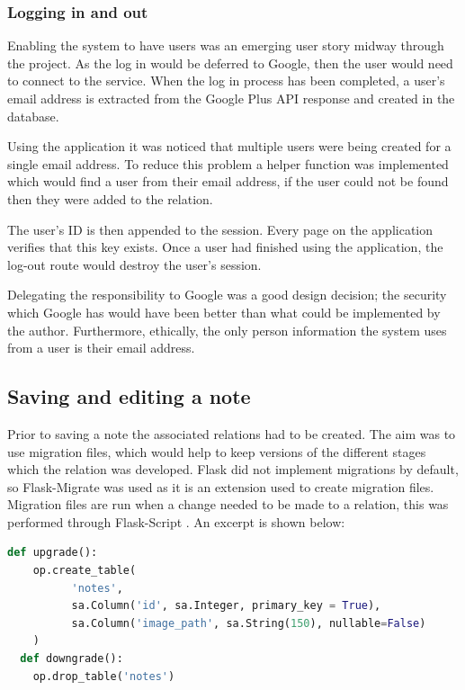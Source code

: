 {{{{{{{\subsubsection{Logging in and out}
Enabling the system to have users was an emerging user story midway through the project. As the log in would be deferred to Google, then the user would need to connect to the service. When the log in process has been completed, a user's email address is extracted from the Google Plus API response and created in the database.

Using the application it was noticed that multiple users were being created for a single email address. To reduce this problem a helper function was implemented which would find a user from their email address, if the user could not be found then they were added to the relation.

The user's ID is then appended to the session. Every page on the application verifies that this key exists. Once a user had finished using the application, the log-out route would destroy the user's session.

Delegating the responsibility to Google was a good design decision; the security which Google has would have been better than what could be implemented by the author. Furthermore, ethically, the only person information the system uses from a user is their email address.

\subsection{Saving and editing a note}
Prior to saving a note the associated relations had to be created. The aim was to use migration files, which would help to keep versions of the different stages which the relation was developed. Flask did not implement migrations by default, so Flask-Migrate \cite{citeulike:14025941} was used as it is an extension used to create migration files. Migration files are run when a change needed to be made to a relation, this was performed through Flask-Script \cite{citeulike:14025943}. An excerpt is shown below:

\begin{lstlisting}[language=python, caption={An excerpt of a specific migration file where the note relation was created}, label={migration}, breaklines, columns=fullflexible, keywordstyle=\color{blue}]
  def upgrade():
    op.create_table(
          'notes',
          sa.Column('id', sa.Integer, primary_key = True),
          sa.Column('image_path', sa.String(150), nullable=False)
    )
  def downgrade():
    op.drop_table('notes')
\end{lstlisting}

}}}}}}}
